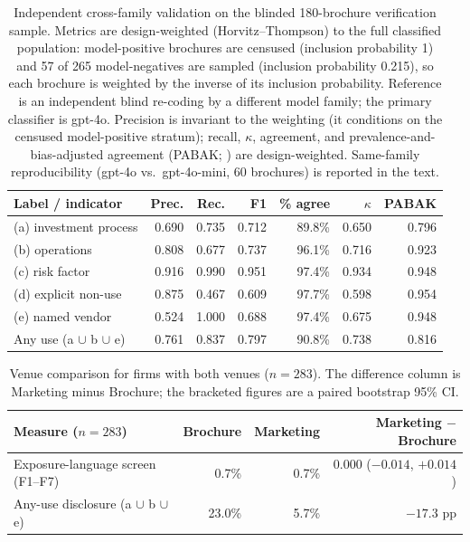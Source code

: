 \documentclass[utf8]{FrontiersinHarvard}
\begin{document}
\begin{table}[h!]
\caption{Independent cross-family validation on the blinded 180-brochure verification sample. Metrics are design-weighted (Horvitz--Thompson) to the full classified population: model-positive brochures are censused (inclusion probability 1) and 57 of 265 model-negatives are sampled (inclusion probability 0.215), so each brochure is weighted by the inverse of its inclusion probability. Reference is an independent blind re-coding by a different model family; the primary classifier is gpt-4o. Precision is invariant to the weighting (it conditions on the censused model-positive stratum); recall, $\kappa$, agreement, and prevalence-and-bias-adjusted agreement (PABAK; \citealp{byrt1993}) are design-weighted. Same-family reproducibility (gpt-4o vs.\ gpt-4o-mini, 60 brochures) is reported in the text.}
\label{tab:validation}
\centering
\small
\begin{tabular}{lrrrrrr}
\toprule
Label / indicator & Prec. & Rec. & F1 & \% agree & $\kappa$ & PABAK \\
\midrule
(a) investment process & 0.690 & 0.735 & 0.712 & 89.8\% & 0.650 & 0.796 \\
(b) operations & 0.808 & 0.677 & 0.737 & 96.1\% & 0.716 & 0.923 \\
(c) risk factor & 0.916 & 0.990 & 0.951 & 97.4\% & 0.934 & 0.948 \\
(d) explicit non-use & 0.875 & 0.467 & 0.609 & 97.7\% & 0.598 & 0.954 \\
(e) named vendor & 0.524 & 1.000 & 0.688 & 97.4\% & 0.675 & 0.948 \\
Any use (a $\cup$ b $\cup$ e) & 0.761 & 0.837 & 0.797 & 90.8\% & 0.738 & 0.816 \\
\bottomrule
\end{tabular}
\end{table}

\begin{table}[h!]
\caption{Venue comparison for firms with both venues ($n = 283$). The difference column is Marketing minus Brochure; the bracketed figures are a paired bootstrap 95\% CI.}
\label{tab:venue}
\centering
\begin{tabular}{lrrr}
\toprule
Measure ($n = 283$) & Brochure & Marketing & Marketing $-$ Brochure \\
\midrule
Exposure-language screen (F1--F7) & 0.7\% & 0.7\% & 0.000 ($-0.014$, $+0.014$) \\
Any-use disclosure (a $\cup$ b $\cup$ e) & 23.0\% & 5.7\% & $-17.3$ pp \\
\bottomrule
\end{tabular}
\end{table}
\end{document}

